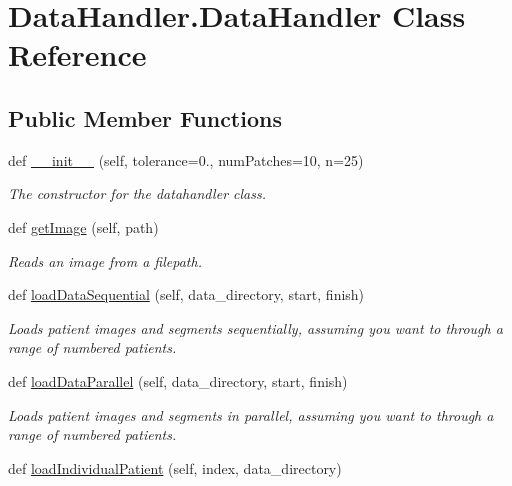 \hypertarget{classDataHandler_1_1DataHandler}{}\section{Data\+Handler.\+Data\+Handler Class Reference}
\label{classDataHandler_1_1DataHandler}
\subsection*{Public Member Functions}
\begin{DoxyCompactItemize}
\item 
def \mbox{\hyperlink{classDataHandler_1_1DataHandler_a698e291c95dd2fb796c21b61a3df02f4}{\+\_\+\+\_\+init\+\_\+\+\_\+}} (self, tolerance=0., num\+Patches=10, n=25)
\begin{DoxyCompactList}\small\item\em The constructor for the datahandler class. \end{DoxyCompactList}\item 
def \mbox{\hyperlink{classDataHandler_1_1DataHandler_a450a64dad593d331764744b305818d0d}{get\+Image}} (self, path)
\begin{DoxyCompactList}\small\item\em Reads an image from a filepath. \end{DoxyCompactList}\item 
def \mbox{\hyperlink{classDataHandler_1_1DataHandler_a66caabe029fda9a6c6c70c0c119e331a}{load\+Data\+Sequential}} (self, data\+\_\+directory, start, finish)
\begin{DoxyCompactList}\small\item\em Loads patient images and segments sequentially, assuming you want to through a range of numbered patients. \end{DoxyCompactList}\item 
def \mbox{\hyperlink{classDataHandler_1_1DataHandler_a88c08a978b49e86c4a4def7b781cb6c2}{load\+Data\+Parallel}} (self, data\+\_\+directory, start, finish)
\begin{DoxyCompactList}\small\item\em Loads patient images and segments in parallel, assuming you want to through a range of numbered patients. \end{DoxyCompactList}\item 
def \mbox{\hyperlink{classDataHandler_1_1DataHandler_afd07d906302728fe91913f71b8f78995}{load\+Individual\+Patient}} (self, index, data\+\_\+directory)

\end{DoxyCompactItemize}
